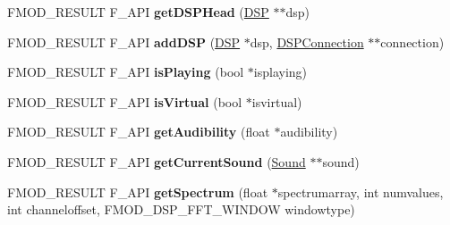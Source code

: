 \begin{DoxyCompactItemize}
\item 
F\+M\+O\+D\+\_\+\+R\+E\+S\+U\+LT F\+\_\+\+A\+PI {\bfseries get\+D\+S\+P\+Head} (\hyperlink{class_f_m_o_d_1_1_d_s_p}{D\+SP} $\ast$$\ast$dsp)\hypertarget{class_f_m_o_d_1_1_channel_a2629c769ba2de6aec89da5c07bf4a535}{}\label{class_f_m_o_d_1_1_channel_a2629c769ba2de6aec89da5c07bf4a535}

\item 
F\+M\+O\+D\+\_\+\+R\+E\+S\+U\+LT F\+\_\+\+A\+PI {\bfseries add\+D\+SP} (\hyperlink{class_f_m_o_d_1_1_d_s_p}{D\+SP} $\ast$dsp, \hyperlink{class_f_m_o_d_1_1_d_s_p_connection}{D\+S\+P\+Connection} $\ast$$\ast$connection)\hypertarget{class_f_m_o_d_1_1_channel_a87b31364ea541df027a5dc89c2d8af2b}{}\label{class_f_m_o_d_1_1_channel_a87b31364ea541df027a5dc89c2d8af2b}

\item 
F\+M\+O\+D\+\_\+\+R\+E\+S\+U\+LT F\+\_\+\+A\+PI {\bfseries is\+Playing} (bool $\ast$isplaying)\hypertarget{class_f_m_o_d_1_1_channel_a0e50e17361a0fc354a674827285539fa}{}\label{class_f_m_o_d_1_1_channel_a0e50e17361a0fc354a674827285539fa}

\item 
F\+M\+O\+D\+\_\+\+R\+E\+S\+U\+LT F\+\_\+\+A\+PI {\bfseries is\+Virtual} (bool $\ast$isvirtual)\hypertarget{class_f_m_o_d_1_1_channel_aba59130d19b04270bbe8d765d79018f9}{}\label{class_f_m_o_d_1_1_channel_aba59130d19b04270bbe8d765d79018f9}

\item 
F\+M\+O\+D\+\_\+\+R\+E\+S\+U\+LT F\+\_\+\+A\+PI {\bfseries get\+Audibility} (float $\ast$audibility)\hypertarget{class_f_m_o_d_1_1_channel_a1b3f068e7ad3ba926b647e0d5d186f5a}{}\label{class_f_m_o_d_1_1_channel_a1b3f068e7ad3ba926b647e0d5d186f5a}

\item 
F\+M\+O\+D\+\_\+\+R\+E\+S\+U\+LT F\+\_\+\+A\+PI {\bfseries get\+Current\+Sound} (\hyperlink{class_f_m_o_d_1_1_sound}{Sound} $\ast$$\ast$sound)\hypertarget{class_f_m_o_d_1_1_channel_af8c6cb4f1490eda077f4a661437a0809}{}\label{class_f_m_o_d_1_1_channel_af8c6cb4f1490eda077f4a661437a0809}

\item 
F\+M\+O\+D\+\_\+\+R\+E\+S\+U\+LT F\+\_\+\+A\+PI {\bfseries get\+Spectrum} (float $\ast$spectrumarray, int numvalues, int channeloffset, F\+M\+O\+D\+\_\+\+D\+S\+P\+\_\+\+F\+F\+T\+\_\+\+W\+I\+N\+D\+OW windowtype)\hypertarget{class_f_m_o_d_1_1_channel_ae3527fdf12e4b0aa49019a7ca02300e6}{}\label{class_f_m_o_d_1_1_channel_ae3527fdf12e4b0aa49019a7ca02300e6}


\end{DoxyCompactItemize}
